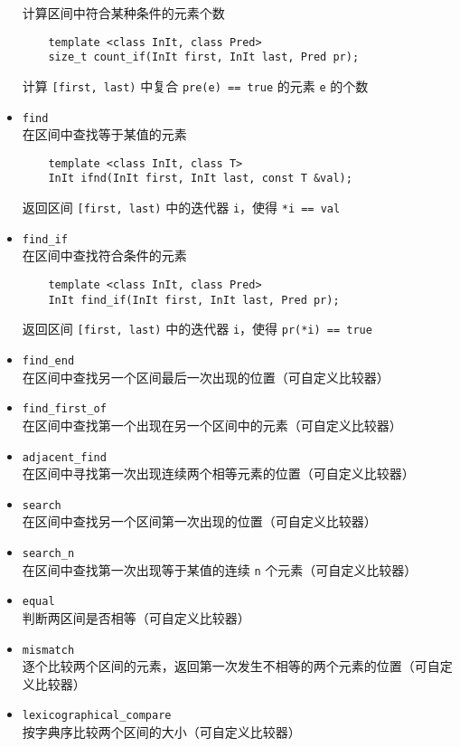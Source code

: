 \documentclass[UTF8]{ctexart}
\begin{document}
\begin{itemize}
    计算区间中符合某种条件的元素个数
    \begin{verbatim}
    template <class InIt, class Pred>
    size_t count_if(InIt first, InIt last, Pred pr);
    \end{verbatim}
    计算 \texttt{[first, last)} 中复合 \texttt{pre(e) == true} 的元素 \texttt{e} 的个数
    \item \texttt{find} \\
    在区间中查找等于某值的元素
    \begin{verbatim}
    template <class InIt, class T>
    InIt ifnd(InIt first, InIt last, const T &val);
    \end{verbatim}
    返回区间 \texttt{[first, last)} 中的迭代器 \texttt{i}，使得 \texttt{*i == val}
    \item \texttt{find\_if} \\
    在区间中查找符合条件的元素
    \begin{verbatim}
    template <class InIt, class Pred>
    InIt find_if(InIt first, InIt last, Pred pr);
    \end{verbatim}
    返回区间 \texttt{[first, last)} 中的迭代器 \texttt{i}，使得 \texttt{pr(*i) == true}
    \item \texttt{find\_end} \\
    在区间中查找另一个区间最后一次出现的位置（可自定义比较器）
    \item \texttt{find\_first\_of} \\
    在区间中查找第一个出现在另一个区间中的元素（可自定义比较器）
    \item \texttt{adjacent\_find} \\
    在区间中寻找第一次出现连续两个相等元素的位置（可自定义比较器）
    \item \texttt{search} \\
    在区间中查找另一个区间第一次出现的位置（可自定义比较器）
    \item \texttt{search\_n} \\
    在区间中查找第一次出现等于某值的连续 \texttt{n} 个元素（可自定义比较器）
    \item \texttt{equal} \\
    判断两区间是否相等（可自定义比较器）
    \item \texttt{mismatch} \\
    逐个比较两个区间的元素，返回第一次发生不相等的两个元素的位置（可自定义比较器）
    \item \texttt{lexicographical\_compare} \\
    按字典序比较两个区间的大小（可自定义比较器）
\end{itemize}
\end{document}

